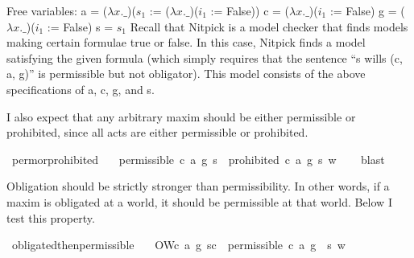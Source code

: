 \begin{isabellebody}
{  Free variables:
    a = ($\lambda x. \_$)($s_1$ := ($\lambda x. \_$)($i_1$ := False))
    c = ($\lambda x. \_$)($i_1$ := False)
    g = ($\lambda x. \_$)($i_1$ := False)
    s = $s_1$\color{black}
Recall that Nitpick is a model checker that finds models making certain formulae true or false. In this 
case, Nitpick finds a model satisfying the given formula (which simply requires that the sentence 
``s wills (c, a, g)'' is permissible but not obligator). This model consists of the above specifications 
of a, c, g, and s.%
}%
\endisatagproof
{\isafoldproof}%
%
\isadelimproof
%
\endisadelimproof
%
\begin{isamarkuptext}%
I also expect that any arbitrary maxim should be either permissible or prohibited, since all 
acts are either permissible or prohibited.%
\end{isamarkuptext}\isamarkuptrue%
\isamarkupfalse%
\ perm{\isacharunderscore}or{\isacharunderscore}prohibited{\isacharcolon}\isanewline
\ \ \ {\isachardoublequoteopen}{\isacharparenleft}{\isacharparenleft}permissible\ {\isacharparenleft}c{\isacharcomma}\ a{\isacharcomma}\ g{\isacharparenright}\ s{\isacharparenright}\ \isactrlbold {\isasymor}\ {\isacharparenleft}prohibited\ {\isacharparenleft}c{\isacharcomma}\ a{\isacharcomma}\ g{\isacharparenright}\ s{\isacharparenright}{\isacharparenright}\ w{\isachardoublequoteclose}\isanewline
%
\isadelimproof
\ \ %
\endisadelimproof
%
\isatagproof
{}\isamarkupfalse%
\ blast\isanewline
%
%
\endisatagproof
{\isafoldproof}%
%
\isadelimproof
%
\endisadelimproof
%
\begin{isamarkuptext}%
Obligation should be strictly stronger than permissibility. In other words, if a maxim is 
obligated at a world, it should be permissible at that world. Below I test this property.%
\end{isamarkuptext}\isamarkuptrue%
\isamarkupfalse%
\ obligated{\isacharunderscore}then{\isacharunderscore}permissible{\isacharcolon}\isanewline
\ \ \ {\isachardoublequoteopen}{\isacharparenleft}O{\isacharbraceleft}W{\isacharparenleft}c{\isacharcomma}\ a{\isacharcomma}\ g{\isacharparenright}\ s{\isacharbar}c{\isacharbraceright}\ \isactrlbold {\isasymrightarrow}\ {\isacharparenleft}{\isacharparenleft}permissible\ {\isacharparenleft}c{\isacharcomma}\ a{\isacharcomma}\ g{\isacharparenright}\ {\isacharparenright}\ s{\isacharparenright}{\isacharparenright}\ w\ {\isachardoublequoteclose}\isanewline

\end{isabellebody}
